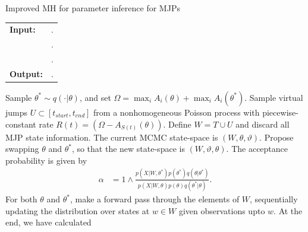 \begin{algorithm}[H]
   \caption{Improved MH for parameter inference for MJPs }
   \label{alg:MH_improved}
  \begin{tabular}{l l}
   \textbf{Input:  } & \text{A set of partial and noisy observations $X$}. \\
                      & \text{The previous MJP path $S(t) = (S, T)$, the previous MJP parameters $\theta$}.\\ 
                     & \text{A  Metropolis-Hasting proposal $q(\cdot | \theta)$}.\\
   \textbf{Output:  }& \text{A new MJP trajectory $S'(t) = (S', T')$, 
                            new MJP parameters $\theta'$}.\\
   \hline
   \end{tabular}
   \begin{algorithmic}[1]
      \State Sample $\theta^* \sim q(\cdot| \theta)$, and 
      set $\Omega = \max_i A_i(\theta) + \max_i A_i(\theta^*)$. 
    \State Sample virtual jumps $U\subset[t_{start}, t_{end}]$ from a nonhomogeneous Poisson process with 
    piecewise-constant rate $R(t) = (\Omega - A_{S(t)}(\theta))$. 
    Define $W = T \cup U$ and discard all MJP state information.
    \State The current MCMC state-space is $(W,\theta,\vartheta)$. Propose swapping
    $\theta$ and $\theta^*$, so that the new state-space is 
    $(W, \vartheta, \theta)$. The acceptance probability is given by
        \begin{align*}
        \alpha %
        &=  1 \wedge \frac{p(X| W,\theta^*)p(\theta^*)q(\theta|\theta^*)}
        {p(X| W,\theta)p(\theta) q(\theta^*|\theta)}.
        \end{align*}
    \State For both $\theta$ and $\theta^*$, make a forward pass through the 
    elements of $W$, sequentially updating the distribution over states at 
    $w \in W$ given observations upto $w$. At the end, we have calculated

\end{algorithmic}
\end{algorithm}
